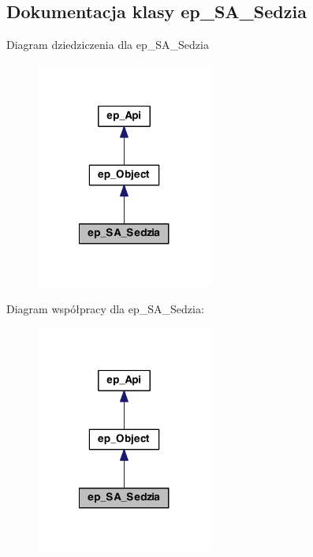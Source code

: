 \hypertarget{classep___s_a___sedzia}{\subsection{Dokumentacja klasy ep\-\_\-\-S\-A\-\_\-\-Sedzia}
\label{classep___s_a___sedzia}
}


Diagram dziedziczenia dla ep\-\_\-\-S\-A\-\_\-\-Sedzia\nopagebreak
\begin{figure}[H]
\begin{center}
\leavevmode
\includegraphics[width=164pt]{classep___s_a___sedzia__inherit__graph}
\end{center}
\end{figure}


Diagram współpracy dla ep\-\_\-\-S\-A\-\_\-\-Sedzia\-:\nopagebreak
\begin{figure}[H]
\begin{center}
\leavevmode
\includegraphics[width=164pt]{classep___s_a___sedzia__coll__graph}
\end{center}
\end{figure}
